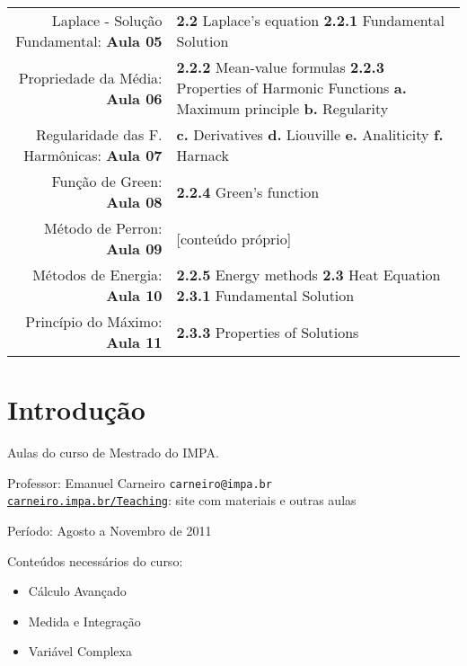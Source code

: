 \documentclass[11pt]{article}
\begin{document}
\begin{center}
	\begin{tabular}{r | p{7.5cm}}
		Laplace - Solução Fundamental: \textbf{Aula 05} & \textbf{2.2} Laplace's equation \newline \textbf{2.2.1} Fundamental Solution \\
		Propriedade da Média: \textbf{Aula 06} & \textbf{2.2.2} Mean-value formulas  \newline \textbf{2.2.3} Properties of Harmonic Functions \newline \textbf{a.} Maximum principle \newline \textbf{b.} Regularity \\
		
		Regularidade das F. Harmônicas: \textbf{Aula 07} & \textbf{c.} Derivatives \newline \textbf{d.} Liouville \newline \textbf{e.} Analiticity \newline \textbf{f.} Harnack \\

		Função de Green: \textbf{Aula 08} & \textbf{2.2.4} Green's function \\

		Método de Perron: \textbf{Aula 09} & [conteúdo próprio] \\

		Métodos de Energia: \textbf{Aula 10} & \textbf{2.2.5} Energy methods \newline \textbf{2.3} Heat Equation \newline \textbf{2.3.1} Fundamental Solution \\
		Princípio do Máximo: \textbf{Aula 11} & \textbf{2.3.3} Properties of Solutions
	\end{tabular}
\end{center}



\section{Introdução}
Aulas do curso de Mestrado do IMPA.

Professor: Emanuel Carneiro \texttt{carneiro@impa.br} \\
\href{https://carneiro.impa.br/index.php/Teaching}{\texttt{carneiro.impa.br/Teaching}}: site com materiais e outras aulas

Período: Agosto a Novembro de 2011

Conteúdos necessários do curso:
\begin{itemize}
	\item Cálculo Avançado
	\item Medida e Integração
	\item Variável Complexa
\end{itemize}
\end{document}
